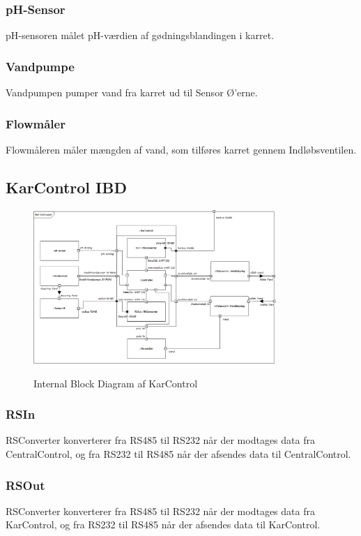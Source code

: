 \subsubsection{pH-Sensor}
pH-sensoren målet pH-værdien af gødningsblandingen i karret.

\subsubsection{Vandpumpe}
Vandpumpen pumper vand fra karret ud til Sensor Ø’erne.

\subsubsection{Flowmåler}
Flowmåleren måler mængden af vand, som tilføres karret gennem Indløbsventilen.


\subsection{KarControl IBD}

\begin{figure}[H]
	\centering
	\includegraphics[width=0.82\textwidth]{Systemarkitektur/KarControl/KarControl_IBD.png}
	\label{fig:KarControl IBD}
	\caption{Internal Block Diagram af KarControl}
\end{figure}

\subsubsection{RSIn}
RSConverter konverterer fra RS485 til RS232 når der modtages data fra CentralControl, og fra RS232 til RS485 når der afsendes data til CentralControl.

\subsubsection{RSOut}
RSConverter konverterer fra RS485 til RS232 når der modtages data fra KarControl, og fra RS232 til RS485 når der afsendes data til KarControl.

